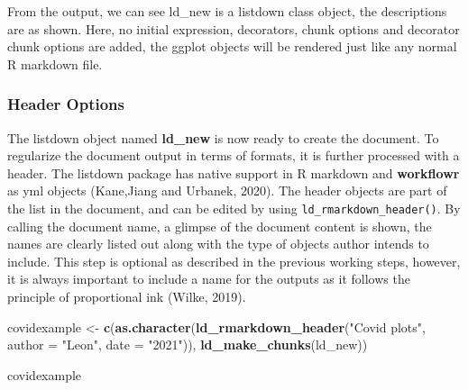 \documentclass[
]{article}
\newenvironment{Shaded}{\begin{snugshade}}{\end{snugshade}}
\newcommand{\DataTypeTok}[1]{\textcolor[rgb]{0.00,0.34,0.68}{#1}}
\newcommand{\KeywordTok}[1]{\textcolor[rgb]{0.12,0.11,0.11}{\textbf{#1}}}
\newcommand{\NormalTok}[1]{\textcolor[rgb]{0.12,0.11,0.11}{#1}}
\newcommand{\StringTok}[1]{\textcolor[rgb]{0.75,0.01,0.01}{#1}}
\begin{document}
From the output, we can see ld\_new is a listdown class object, the
descriptions are as shown. Here, no initial expression, decorators,
chunk options and decorator chunk options are added, the ggplot objects
will be rendered just like any normal R markdown file.

\hypertarget{header-options}{%
\subsubsection{Header Options}\label{header-options}}

The listdown object named \textbf{ld\_new} is now ready to create the
document. To regularize the document output in terms of formats, it is
further processed with a header. The listdown package has native support
in R markdown and \textbf{workflowr} as yml objects (Kane,Jiang and
Urbanek, 2020). The header objects are part of the list in the document,
and can be edited by using \texttt{ld\_rmarkdown\_header()}. By calling
the document name, a glimpse of the document content is shown, the names
are clearly listed out along with the type of objects author intends to
include. This step is optional as described in the previous working
steps, however, it is always important to include a name for the outputs
as it follows the principle of proportional ink (Wilke, 2019).

\begin{Shaded}
\begin{Highlighting}[]
\NormalTok{covidexample \textless{}{-}}
\StringTok{  }\KeywordTok{c}\NormalTok{(}\KeywordTok{as.character}\NormalTok{(}\KeywordTok{ld\_rmarkdown\_header}\NormalTok{(}\StringTok{"Covid plots"}\NormalTok{, }\DataTypeTok{author =} \StringTok{"Leon"}\NormalTok{, }\DataTypeTok{date =} \StringTok{"2021"}\NormalTok{)),}
    \KeywordTok{ld\_make\_chunks}\NormalTok{(ld\_new))}

\NormalTok{covidexample}
\end{Highlighting}
\end{Shaded}
\end{document}
